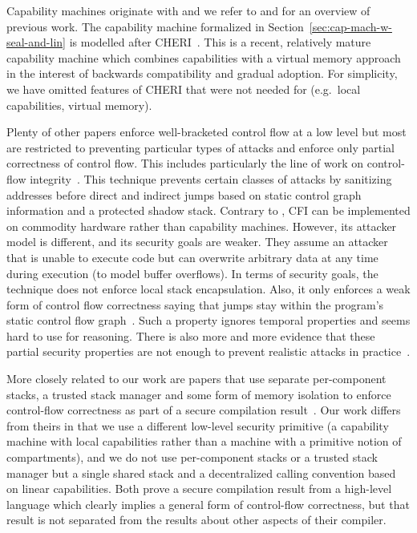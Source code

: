 \documentclass[acmsmall,screen]{acmart}\settopmatter{}
\begin{document}
Capability machines originate with \citet{dennis_programming_1966} and we refer to \citet{levy_capability-based_1984} and \citet{watson_cheri_2015} for an overview of previous work.
The capability machine formalized in Section~\ref{sec:cap-mach-w-seal-and-lin} is modelled after CHERI~\citep{watson_cheri_2015,woodruff_cheri_2014}.
This is a recent, relatively mature capability machine which combines capabilities with a virtual memory approach in the interest of backwards compatibility and gradual adoption.
For simplicity, we have omitted features of CHERI that were not needed for \stktokens{} (e.g.\ local capabilities, virtual memory).

Plenty of other papers enforce well-bracketed control flow at a low level but most are restricted to preventing particular types of attacks and enforce only partial correctness of control flow.
This includes particularly the line of work on control-flow integrity~\citep{abadi_control-flow_2005}.
This technique prevents certain classes of attacks by sanitizing addresses before direct and indirect jumps based on static control graph information and a protected shadow stack.
Contrary to \stktokens{}, CFI can be implemented on commodity hardware rather than capability machines.
However, its attacker model is different, and its security goals are weaker.
They assume an attacker that is unable to execute code but can overwrite arbitrary data at any time during execution (to model buffer overflows).
In terms of security goals, the technique does not enforce local stack encapsulation.
Also, it only enforces a weak form of control flow correctness saying that jumps stay within the program's static control flow graph~\cite{Abadi2005Theory}.
Such a property ignores temporal properties and seems hard to use for reasoning.
There is also more and more evidence that these partial security properties are not enough to prevent realistic attacks in practice~\citep{Evans:2015:CJW:2810103.2813646,Carlini2015ControlFlowBending}.

More closely related to our work are papers that use separate per-component stacks, a trusted stack manager and some form of memory isolation to enforce control-flow correctness as part of a secure compilation result~\citep{patrignani_modular_2016,juglaret_beyond_2016}.
Our work differs from theirs in that we use a different low-level security primitive (a capability machine with local capabilities rather than a machine with a primitive notion of compartments), and we do not use per-component stacks or a trusted stack manager but a single shared stack and a decentralized calling convention based on linear capabilities.
Both prove a secure compilation result from a high-level language which clearly implies a general form of control-flow correctness, but that result is not separated from the results about other aspects of their compiler.
\end{document}
